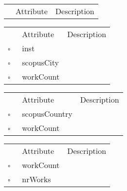 \begin{table}
\caption{School  }

\begin{longtable}{llp{8cm}}
& Attribute & Description \\
\end{longtable}
\label{attr:School}
\end{table}

\begin{table}
\caption{ScopusAffiliation  }

\begin{longtable}{llp{8cm}}
& Attribute & Description \\
$\square$\ & inst &  \\
$\square$\ & scopusCity &  \\
$\square$\ & workCount &  \\
\end{longtable}
\label{attr:ScopusAffiliation}
\end{table}

\begin{table}
\caption{ScopusCity  }

\begin{longtable}{llp{8cm}}
& Attribute & Description \\
$\square$\ & scopusCountry &  \\
$\square$\ & workCount &  \\
\end{longtable}
\label{attr:ScopusCity}
\end{table}

\clearpage
\begin{table}
\caption{ScopusCountry  }

\begin{longtable}{llp{8cm}}
& Attribute & Description \\
$\square$\ & workCount &  \\
$\square$\ & nrWorks &  \\
\end{longtable}
\label{attr:ScopusCountry}
\end{table}

